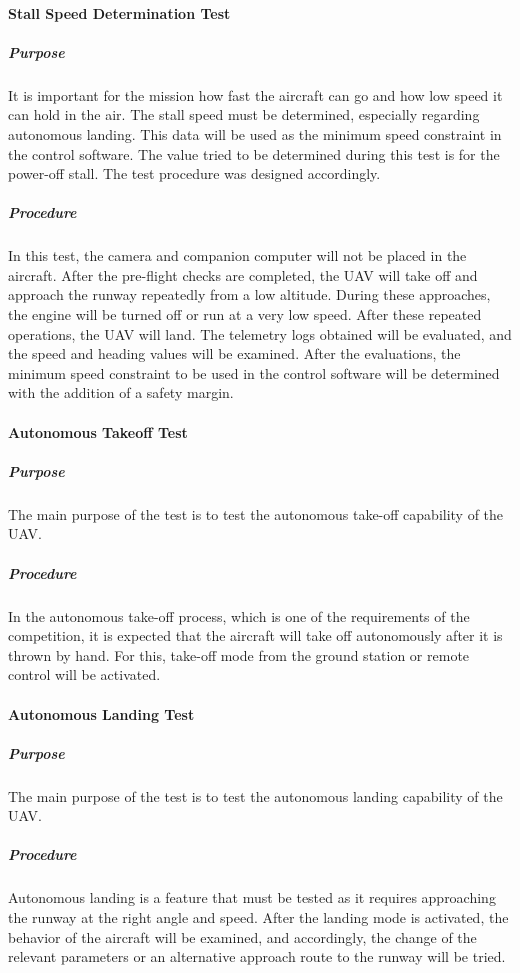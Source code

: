 \documentclass[12pt]{article}
\begin{document}
\paragraph*{Stall Speed Determination Test}

\subparagraph*{Purpose} It is important for the mission how fast the aircraft can go and how low speed it can hold in the air. The stall speed must be determined, especially regarding autonomous landing. This data will be used as the minimum speed constraint in the control software.
The value tried to be determined during this test is for the power-off stall. The test procedure was designed accordingly.

\subparagraph*{Procedure} In this test, the camera and companion computer will not be placed in the aircraft.
After the pre-flight checks are completed, the UAV will take off and approach the runway repeatedly from a low altitude. During these approaches, the engine will be turned off or run at a very low speed. After these repeated operations, the UAV will land. The telemetry logs obtained will be evaluated, and the speed and heading values will be examined. After the evaluations, the minimum speed constraint to be used in the control software will be determined with the addition of a safety margin.

\paragraph*{Autonomous Takeoff Test} 

\subparagraph*{Purpose} The main purpose of the test is to test the autonomous take-off capability of the UAV.

\subparagraph*{Procedure} In the autonomous take-off process, which is one of the requirements of the competition, it is expected that the aircraft will take off autonomously after it is thrown by hand. For this, take-off mode from the ground station or remote control will be activated.

\paragraph*{Autonomous Landing Test} 

\subparagraph*{Purpose} The main purpose of the test is to test the autonomous landing capability of the UAV.

\subparagraph*{Procedure} Autonomous landing is a feature that must be tested as it requires approaching the runway at the right angle and speed. After the landing mode is activated, the behavior of the aircraft will be examined, and accordingly, the change of the relevant parameters or an alternative approach route to the runway will be tried.
\end{document}
